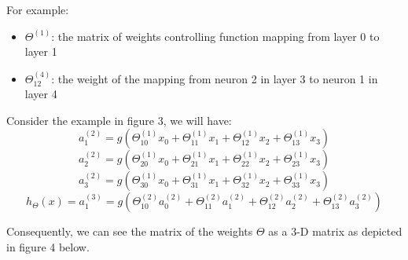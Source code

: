 \documentclass[12pt]{article}
\begin{document}
	For example:
	\begin{itemize}
		\item $\Theta^{(1)}$: the matrix of weights controlling function mapping from layer 0 to layer 1
		\item $\Theta_{12}^{(4)}$: the weight of the mapping from neuron 2 in layer 3 to neuron 1 in layer 4 
	\end{itemize}	

	Consider the example in figure 3, we will have:
	\begin{equation}
		a_1^{(2)} = g(\Theta_{10}^{(1)} x_0 + \Theta_{11}^{(1)} x_1 + \Theta_{12}^{(1)} x_2 + \Theta_{13}^{(1)} x_3)	
	\end{equation}
	\begin{equation}
		a_2^{(2)} = g(\Theta_{20}^{(1)} x_0 + \Theta_{21}^{(1)} x_1 + \Theta_{22}^{(1)} x_2 + \Theta_{23}^{(1)} x_3)
	\end{equation}
	\begin{equation}
		a_3^{(2)} = g(\Theta_{30}^{(1)} x_0 + \Theta_{31}^{(1)} x_1 + \Theta_{32}^{(1)} x_2 + \Theta_{33}^{(1)} x_3)
	\end{equation}
	\begin{equation}
		h_\Theta (x) = a_1^{(3)}  = g(\Theta_{10}^{(2)} a_0^{(2)} + \Theta_{11}^{(2)} a_1^{(2)} + \Theta_{12}^{(2)} a_2^{(2)} + \Theta_{13}^{(2)} a_3^{(2)})
	\end{equation}
	
	Consequently, we can see the matrix of the weights $\Theta$ as a 3-D matrix as depicted in figure 4 below.
	
	\begin{center}
		\label{labelname}
	\end{center}
	
\end{document}
